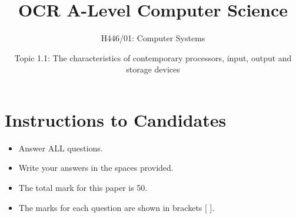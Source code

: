 \documentclass{article}
\title{OCR A-Level Computer Science}
\subtitle{H446/01: Computer Systems}
\author{Topic 1.1: The characteristics of contemporary processors, input, output and storage devices}
\date{}
\begin{document}
\maketitle

\section*{Instructions to Candidates}
\begin{itemize}
    \item Answer ALL questions.
    \item Write your answers in the spaces provided.
    \item The total mark for this paper is 50.
    \item The marks for each question are shown in brackets [ ].
\end{itemize}

\vspace{1cm}
\end{document}
